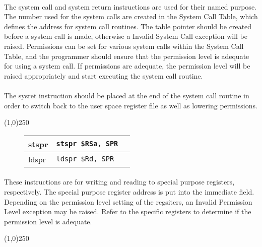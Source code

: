 \documentclass[letterpaper, 11pt]{article}
\begin{document}
\paragraph{} The system call and system return instructions are used for their named purpose. The number used for the system calls are created
in the System Call Table, which defines the address for system call routines. The table pointer should be created before a system call is made,
otherwise a Invalid System Call exception will be raised. Permissions can be set for various system calls within the System Call Table, and the
programmer should ensure that the permission level is adequate for using a system call. If permissions are adequate, the permission level will
be raised appropriately and start executing the system call routine.
\paragraph{}The sysret instruction should be placed at the end of the system call routine in order to switch back
to the user space register file as well as lowering permissions.

\begin{center}
	\line(1,0){250}
\end{center}


\begin{figure}[!h]
	\begin{center}
		\begin{tabular}{|l|l|l|}
			\hline
			stspr		& \texttt{stspr \$RSa, SPR}	\\ \hline
			ldspr		& \texttt{ldspr \$Rd, SPR}	\\ \hline
		 		\end{tabular} 
	\end{center}
	
\end{figure}
\paragraph{} These instructions are for writing and reading to special purpose registers, respectively. The special purpose register address is put
into the immediate field. Depending on the permission level setting of the regsiters, an Invalid Permission Level exception may be raised.
Refer to the specific registers to determine if the permission level is adequate.

\begin{center}
	\line(1,0){250}
\end{center}
\end{document}
